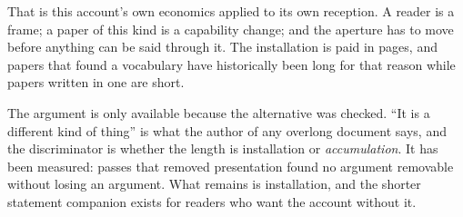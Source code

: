 \documentclass[11pt,a4paper]{article}
\theoremstyle{remark}\newtheorem{remark}[definition]{Remark}
\begin{document}
That is this account's own economics applied to its own reception. A reader is a
frame; a paper of this kind is a capability change; and the aperture has to move before anything can be
said through it. The installation is paid in pages, and papers that found a vocabulary have historically
been long for that reason while papers written in one are short.

The argument is only available because the alternative was checked. ``It is a different kind of thing''
is what the author of any overlong document says, and the discriminator is whether the length is
installation or \emph{accumulation}. It has been measured: passes that removed presentation found no
argument removable without losing an argument. What remains is installation, and the shorter statement
companion exists for readers who want the account without it.
\end{document}
